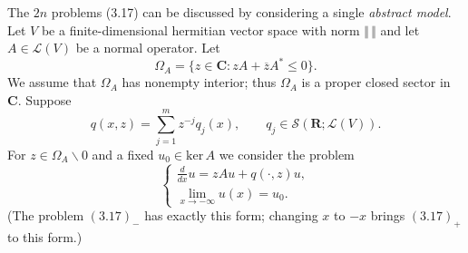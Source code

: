 \documentclass{surv-l}
\theoremstyle{plain}
\theoremstyle{definition}
\numberwithin{equation}{chapter}
\begin{document}
The $2n$ problems (3.17) can be discussed by considering a single \emph{abstract model}. Let $V$ be a finite-dimensional hermitian vector space with norm $\Vert\,\Vert$ and let $A\in \mathscr{L}(V)$ be a normal operator. Let
\begin{equation}\label{eq3.19}
\Omega_{A}=\{z\in \mathbf{C}:zA+\overline{z}A^{*}\leq 0\}.
\end{equation}
We assume that $\Omega_{A}$ has nonempty interior; thus $\Omega_{A}$ is a proper closed sector in $\mathbf{C}$. Suppose
\begin{equation}\label{eq3.20}
q(x, z)=\sum_{j=1}^{m}z^{-j}q_{j}(x), \qquad q_{j}\in \mathscr{S}(\mathbf{R};\mathscr{L}(V)).
\end{equation}
For $z\in\Omega_{A}\backslash 0$ and a fixed $u_{0}\in \mathrm{ker}\,A$ we consider the problem
\begin{equation}\label{eq3.21}
\left\{\begin{array}{l}
\frac{d}{dx}u=zAu+q(\cdot, z)u,\\
\lim_{x\rightarrow-\infty}u(x)=u_{0}.
\end{array}\right.
\end{equation}
(The problem $(3.17)_{-}$ has exactly this form; changing $x$ to $-x$ brings $(3.17)_{+}$ to this form.)
\end{document}
